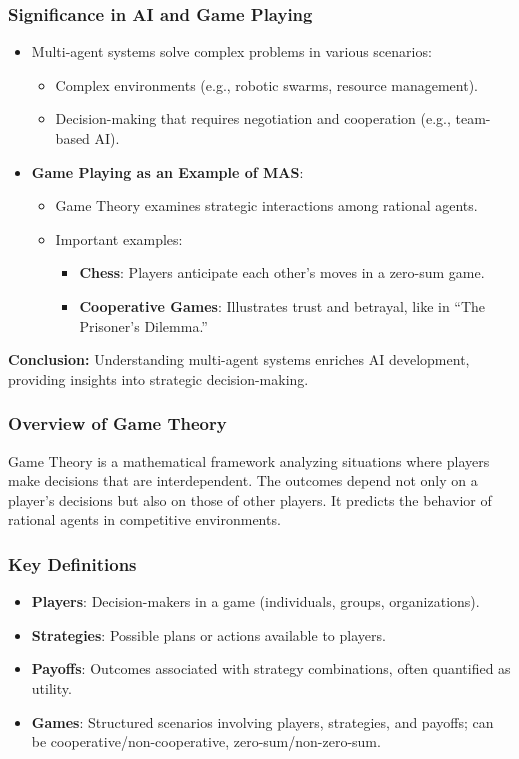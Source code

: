 \documentclass[aspectratio=169]{beamer}
\begin{document}
\begin{frame}[fragile]
    \frametitle{Significance in AI and Game Playing}

    \begin{itemize}
        \item Multi-agent systems solve complex problems in various scenarios:
        \begin{itemize}
            \item Complex environments (e.g., robotic swarms, resource management).
            \item Decision-making that requires negotiation and cooperation (e.g., team-based AI).
        \end{itemize}
        
        \item \textbf{Game Playing as an Example of MAS}:
        \begin{itemize}
            \item Game Theory examines strategic interactions among rational agents.
            \item Important examples:
            \begin{itemize}
                \item \textbf{Chess}: Players anticipate each other's moves in a zero-sum game.
                \item \textbf{Cooperative Games}: Illustrates trust and betrayal, like in “The Prisoner's Dilemma.”
            \end{itemize}
        \end{itemize}
    \end{itemize}
    
    \textbf{Conclusion:} Understanding multi-agent systems enriches AI development, providing insights into strategic decision-making.
\end{frame}

\begin{frame}[fragile]
    \frametitle{Overview of Game Theory}
    Game Theory is a mathematical framework analyzing situations where players make decisions that are interdependent. The outcomes depend not only on a player's decisions but also on those of other players. It predicts the behavior of rational agents in competitive environments.
\end{frame}

\begin{frame}[fragile]
    \frametitle{Key Definitions}
    \begin{itemize}
        \item \textbf{Players}: Decision-makers in a game (individuals, groups, organizations).
        \item \textbf{Strategies}: Possible plans or actions available to players.
        \item \textbf{Payoffs}: Outcomes associated with strategy combinations, often quantified as utility.
        \item \textbf{Games}: Structured scenarios involving players, strategies, and payoffs; can be cooperative/non-cooperative, zero-sum/non-zero-sum.
    \end{itemize}
\end{frame}
\end{document}

